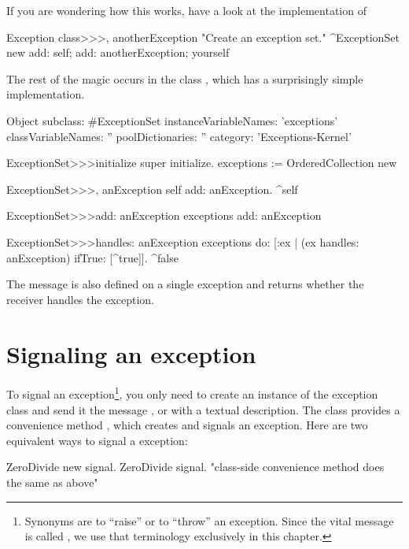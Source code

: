 If you are wondering how this works, have a look at the implementation of 

\begin{code}{}
Exception class>>>, anotherException
	"Create an exception set."
	^ExceptionSet new add: self; add: anotherException; yourself
\end{code}

The rest of the magic occurs in the class , which has a surprisingly simple implementation.

\begin{code}{}
Object subclass: #ExceptionSet
	instanceVariableNames: 'exceptions'
	classVariableNames: ''
	poolDictionaries: ''
	category: 'Exceptions-Kernel'

ExceptionSet>>>initialize
	super initialize.
	exceptions := OrderedCollection new

ExceptionSet>>>, anException
	self add: anException.
	^self

ExceptionSet>>>add: anException
	exceptions add: anException

ExceptionSet>>>handles: anException
	exceptions do: [:ex | (ex handles: anException) ifTrue: [^true]].
	^false
\end{code}

The message  is also defined on a single exception and returns whether the receiver handles the exception.





\section{Signaling an exception}

To signal an exception\footnote{Synonyms are to ``raise'' or to ``throw'' an exception. Since the vital message is called , we use that terminology exclusively in this chapter.}, you only need to create an instance of the exception class and send it the message , or  with a textual description. The class  provides a convenience method , which creates and signals an exception. Here are two equivalent ways to signal a  exception:
\begin{code}{}
	ZeroDivide new signal.
	ZeroDivide signal.    "class-side convenience method does the same as above"
\end{code}

